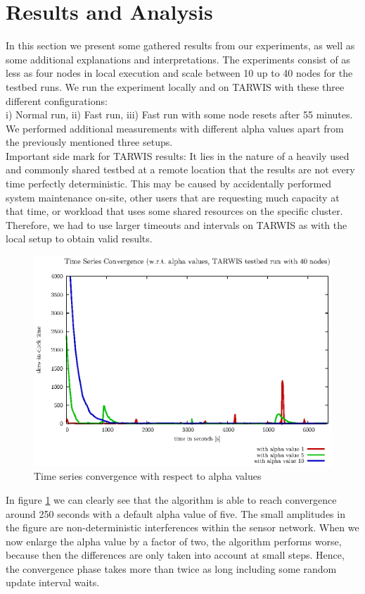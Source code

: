 \documentclass{llncs}
\begin{document}
\section{Results and Analysis}
In this section we present some gathered results from our experiments, as well as some additional explanations and interpretations. The experiments consist of as less as four nodes in local execution and scale between 10 up to 40 nodes for the testbed runs. We run the experiment locally and on TARWIS with these three different configurations:\\ i) Normal run, ii) Fast run, iii) Fast run with some node resets after 55 minutes.\\
We performed additional measurements with different alpha values apart from the previously mentioned three setups.\\
\indent Important side mark for TARWIS results: It lies in the nature of a heavily used and commonly shared testbed at a remote location that the results are not every time perfectly deterministic. This may be caused by accidentally performed system maintenance on-site, other users that are requesting much capacity at that time, or workload that uses some shared resources on the specific cluster. Therefore, we had to use larger timeouts and intervals on TARWIS as with the local setup to obtain valid results.
\begin{figure}[H]
\centering
\includegraphics[scale=0.6]{images/FIG_01.eps}
\caption{Time series convergence with respect to alpha values}
\label{fig:alpha}
\end{figure}
\noindent In figure \ref{fig:alpha} we can clearly see that the algorithm is able to reach convergence around 250 seconds with a default alpha value of five. The small amplitudes in the figure are non-deterministic interferences within the sensor network. When we now enlarge the alpha value by a factor of two, the algorithm performs worse, because then the differences are only taken into account at small steps. Hence, the convergence phase takes more than twice as long including some random update interval waits.\\
\end{document}
